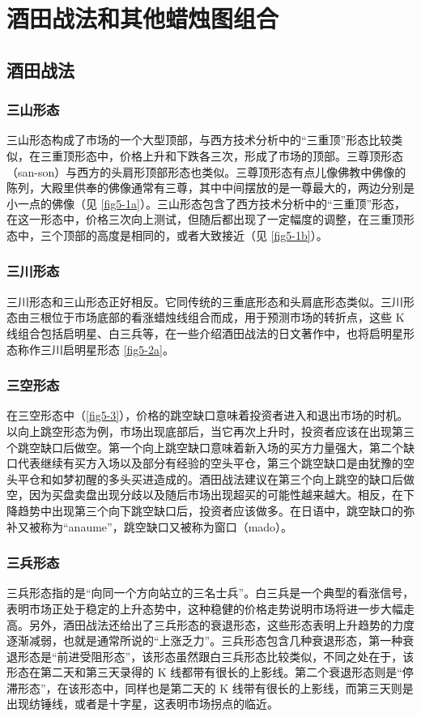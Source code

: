 \chapter{酒田战法和其他蜡烛图组合}
\section{酒田战法}
\subsection{三山形态}
三山形态构成了市场的一个大型顶部，与西方技术分析中的“三重顶”形态比较类似，在三重顶形态中，价格上升和下跌各三次，形成了市场的顶部。三尊顶形态（san-son）与西方的头肩形顶部形态也类似。三尊顶形态有点儿像佛教中佛像的陈列，大殿里供奉的佛像通常有三尊，其中中间摆放的是一尊最大的，两边分别是小一点的佛像（见 \autoref{fig5-1a}）。三山形态包含了西方技术分析中的“三重顶”形态，在这一形态中，价格三次向上测试，但随后都出现了一定幅度的调整，在三重顶形态中，三个顶部的高度是相同的，或者大致接近（见 \autoref{fig5-1b}）。

\subsection{三川形态}
三川形态和三山形态正好相反。它同传统的三重底形态和头肩底形态类似。三川形态由三根位于市场底部的看涨蜡烛线组合而成，用于预测市场的转折点，这些 K 线组合包括启明星、白三兵等，在一些介绍酒田战法的日文著作中，也将启明星形态称作三川启明星形态 \autoref{fig5-2a}。

\subsection{三空形态}
在三空形态中（\autoref{fig5-3}），价格的跳空缺口意味着投资者进入和退出市场的时机。以向上跳空形态为例，市场出现底部后，当它再次上升时，投资者应该在出现第三个跳空缺口后做空。第一个向上跳空缺口意味着新入场的买方力量强大，第二个缺口代表继续有买方入场以及部分有经验的空头平仓，第三个跳空缺口是由犹豫的空头平仓和如梦初醒的多头买进造成的。酒田战法建议在第三个向上跳空的缺口后做空，因为买盘卖盘出现分歧以及随后市场出现超买的可能性越来越大。相反，在下降趋势中出现第三个向下跳空缺口后，投资者应该做多。在日语中，跳空缺口的弥补又被称为“anaume”，跳空缺口又被称为窗口（mado）。

\subsection{三兵形态}
三兵形态指的是“向同一个方向站立的三名士兵”。白三兵是一个典型的看涨信号，表明市场正处于稳定的上升态势中，这种稳健的价格走势说明市场将进一步大幅走高。另外，酒田战法还给出了三兵形态的衰退形态，这些形态表明上升趋势的力度逐渐减弱，也就是通常所说的“上涨乏力”。三兵形态包含几种衰退形态，第一种衰退形态是“前进受阻形态”，该形态虽然跟白三兵形态比较类似，不同之处在于，该形态在第二天和第三天录得的 K 线都带有很长的上影线。第二个衰退形态则是“停滞形态”，在该形态中，同样也是第二天的 K 线带有很长的上影线，而第三天则是出现纺锤线，或者是十字星，这表明市场拐点的临近。